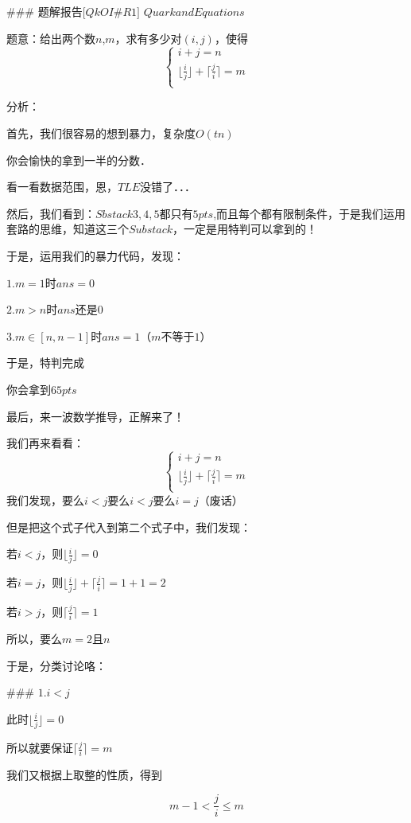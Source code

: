
### 题解报告$[$$QkOI$#$R1$$]$ $Quark and Equations$

题意：给出两个数$n$,$m$，求有多少对$(i,j)$，使得
$$\begin{cases}
i+j=n\\
\lfloor \frac{i}{j} \rfloor+\lceil \frac{j}{i} \rceil=m\\
\end{cases}
$$

分析：

首先，我们很容易的想到暴力，复杂度$O(tn)$

你会愉快的拿到一半的分数．

看一看数据范围，恩，$TLE$没错了．．．

然后，我们看到：$Sbstack3,4,5$都只有$5pts$,而且每个都有限制条件，于是我们运用套路的思维，知道这三个$Substack$，一定是用特判可以拿到的！

于是，运用我们的暴力代码，发现：

$1.m=1$时$ans=0$

$2.m>n$时$ans$还是$0$

$3.m∈[n,n-1]$时$ans=1$（$m$不等于$1$）

于是，特判完成

你会拿到$65pts$~~

最后，来一波数学推导，正解来了！

我们再来看看：
$$\begin{cases}
i+j=n\\
\lfloor \frac{i}{j} \rfloor+\lceil \frac{j}{i} \rceil=m\\
\end{cases}
$$
我们发现，要么$i < j$要么$i < j$要么$i=j$（废话）

但是把这个式子代入到第二个式子中，我们发现：

若$i < j$，则$\lfloor \frac{i}{j} \rfloor=0$

若$i = j$，则$\lfloor \frac{i}{j} \rfloor+\lceil \frac{j}{i} \rceil=1+1=2$

若$i > j$，则$\lceil \frac{j}{i} \rceil=1$

所以，要么$m=2$且$n$%

于是，分类讨论咯：

### $1.i<j$

此时$\lfloor \frac{i}{j} \rfloor=0$

所以就要保证$\lceil \frac{j}{i} \rceil=m$

我们又根据上取整的性质，得到

$$m-1<\frac{j}{i} \leq m$$

